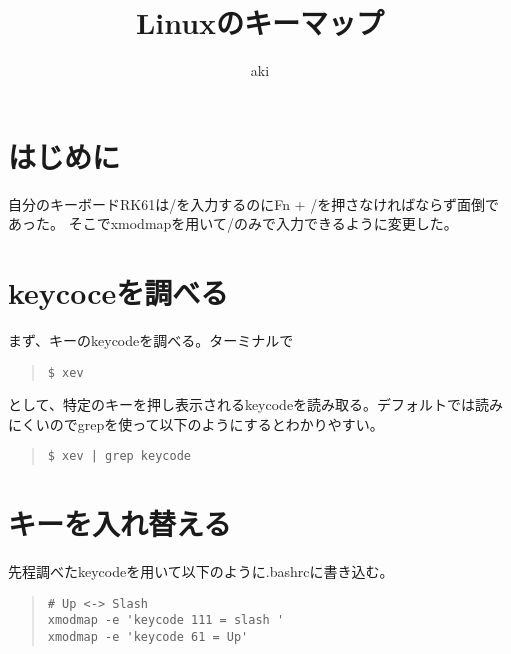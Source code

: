 \documentclass[dvipdfmx]{jsarticle}
\begin{document}
\title{Linuxのキーマップ}
\author{aki}
\thispagestyle{empty}
\maketitle

\section{はじめに}
自分のキーボードRK61は/を入力するのにFn + /を押さなければならず面倒であった。
そこでxmodmapを用いて/のみで入力できるように変更した。

\section{keycoceを調べる}

まず、キーのkeycodeを調べる。ターミナルで

\begin{quote}
    \begin{verbatim}
$ xev
    \end{verbatim}
\end{quote}

として、特定のキーを押し表示されるkeycodeを読み取る。デフォルトでは読みにくいのでgrepを使って以下のようにするとわかりやすい。

\begin{quote}
    \begin{verbatim}
$ xev | grep keycode
    \end{verbatim}
\end{quote}

\section{キーを入れ替える}

先程調べたkeycodeを用いて以下のように.bashrcに書き込む。

\begin{quote}
    \begin{verbatim}
# Up <-> Slash
xmodmap -e 'keycode 111 = slash '
xmodmap -e 'keycode 61 = Up'
    \end{verbatim}
\end{quote}
\end{document}
